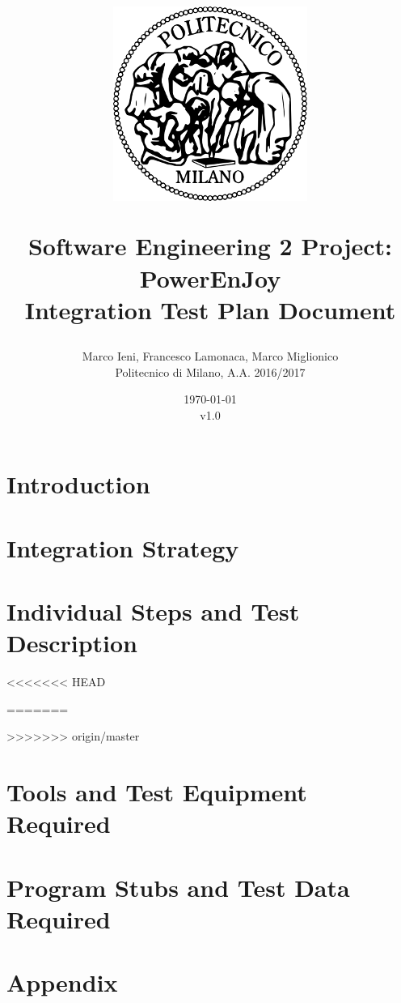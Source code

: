 \documentclass[a4paper, 12pt]{report}
\title{
	\begin{figure}[h]
		\centering
		\includegraphics{../common_resources/logo_polimi.png}
	\end{figure}
	\vspace{30px}
	Software Engineering 2 Project: PowerEnJoy \\ \vspace{1em}
	\textbf{I}ntegration \textbf{T}est \textbf{P}lan \textbf{D}ocument
}
\author{Marco Ieni, Francesco Lamonaca, Marco Miglionico\\Politecnico di Milano, A.A. 2016/2017}
\date{\today\\v1.0}
\begin{document}
\maketitle
\tableofcontents

\chapter{Introduction}
\label{ch:introduction}





\chapter{Integration Strategy}
\label{ch:integration_strategy}





\chapter{Individual Steps and Test Description}
\label{ch:individual_steps}







<<<<<<< HEAD



=======

>>>>>>> origin/master



\chapter{Tools and Test Equipment Required}
\label{ch:tools}



\chapter{Program Stubs and Test Data Required}
\label{ch:program_stubs}





\appendix
\chapter{Appendix}

\end{document}
